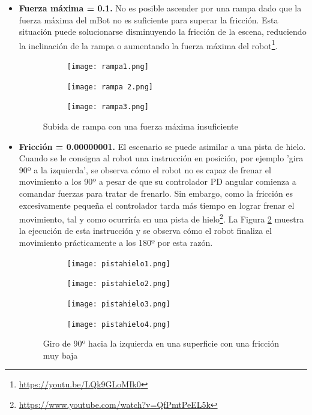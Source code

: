 \begin{itemize}

  \item \textbf{Fuerza máxima = 0.1.} No es posible ascender por una rampa dado que la fuerza máxima del mBot no es suficiente para superar la fricción. Esta situación puede solucionarse disminuyendo la fricción de la escena, reduciendo la inclinación de la rampa o aumentando la fuerza máxima del robot\footnote{\url{https://youtu.be/LQk9GLoMIk0}}.
    
    \begin{figure}[h!]
  \begin{subfigure}[b]{0.3\textwidth}
    \texttt{[image: rampa1.png]}
  \end{subfigure}
  \hfill
  \begin{subfigure}[b]{0.3\textwidth}
    \texttt{[image: rampa 2.png]}
  \end{subfigure}
    \hfill
  \begin{subfigure}[b]{0.3\textwidth}
    \texttt{[image: rampa3.png]}
  \end{subfigure}
\caption{Subida de rampa con una fuerza máxima insuficiente}
\label{fig:rampa}
\end{figure}
    \item \textbf{Fricción = 0.00000001.} El escenario se puede asimilar a una pista de hielo. Cuando se le consigna al robot una instrucción en posición, por ejemplo 'gira 90º a la izquierda', se observa cómo el robot no es capaz de frenar el movimiento a los 90º a pesar de que su controlador PD angular comienza a comandar fuerzas para tratar de frenarlo. Sin embargo, como la fricción es excesivamente pequeña el controlador tarda más tiempo en lograr frenar el movimiento, tal y como ocurriría en una pista de hielo\footnote{\url{https://www.youtube.com/watch?v=QfPmtPeEL5k}}. La Figura \ref{fig:pistahielo} muestra la ejecución de esta instrucción y se observa cómo el robot finaliza el movimiento prácticamente a los 180º por esta razón.

\begin{figure}[h!]
  \begin{subfigure}[b]{0.5\textwidth}
    \texttt{[image: pistahielo1.png]}
  \end{subfigure}
  \hfill
  \hfill
  \begin{subfigure}[b]{0.5\textwidth}
    \texttt{[image: pistahielo2.png]}
  \end{subfigure}
    \hfill
    \hfill
  \begin{subfigure}[b]{0.5\textwidth}
    \texttt{[image: pistahielo3.png]}
  \end{subfigure}
    \hfill
  \begin{subfigure}[b]{0.5\textwidth}
    \texttt{[image: pistahielo4.png]}
  \end{subfigure}
\caption{Giro de 90º hacia la izquierda en una superficie con una fricción muy baja}
\label{fig:pistahielo}
\end{figure}
\end{itemize}

